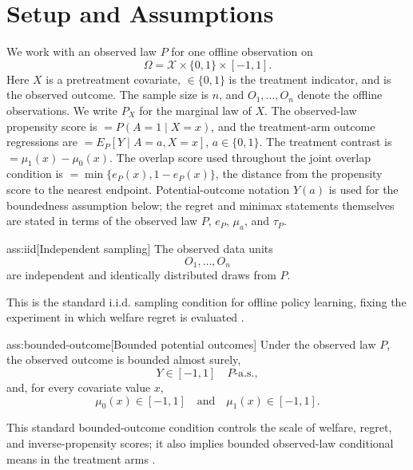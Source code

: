 \documentclass[11pt]{article}
\begin{document}
\section{Setup and Assumptions}

We work with an observed law \(P\) for one offline observation  on
\[
\Omega=\mathcal X\times\{0,1\}\times[-1,1].
\]
Here \(X\) is a pretreatment covariate, \(\in\{0,1\}\) is the treatment indicator, and  is the observed outcome.  The sample size is \(n\), and \(O_1,\ldots,O_n\) denote the offline observations.  We write \(P_X\) for the marginal law of \(X\).  The observed-law propensity score is \(=P(A=1\mid X=x)\), and the treatment-arm outcome regressions are \(=E_P[Y\mid A=a,X=x]\), \(a\in\{0,1\}\).  The treatment contrast is \(=\mu_1(x)-\mu_0(x)\).  The overlap score used throughout the joint overlap condition is \(=\min\{e_P(x),1-e_P(x)\}\), the distance from the propensity score to the nearest endpoint.  Potential-outcome notation \(Y(a)\) is used for the boundedness assumption below; the regret and minimax statements themselves are stated in terms of the observed law \(P\), \(e_P\), \(\mu_a\), and \(\tau_P\).

\begin{assumptionv}{ass:iid}[Independent sampling]
The observed data units
\[
O_1,\ldots,O_n
\]
are independent and identically distributed draws from \(P\).
\end{assumptionv}

This is the standard i.i.d. sampling condition for offline policy learning, fixing the experiment in which welfare regret is evaluated \citep{Athey2021}.

\begin{assumptionv}{ass:bounded-outcome}[Bounded potential outcomes]
Under the observed law \(P\), the observed outcome is bounded almost surely,
\[
Y\in[-1,1]\quad P\text{-a.s.},
\]
and, for every covariate value \(x\),
\[
\mu_0(x)\in[-1,1]\quad\text{and}\quad \mu_1(x)\in[-1,1].
\]
\end{assumptionv}

This standard bounded-outcome condition controls the scale of welfare, regret, and inverse-propensity scores; it also implies bounded observed-law conditional means in the treatment arms \citep{Athey2021}.
\end{document}
